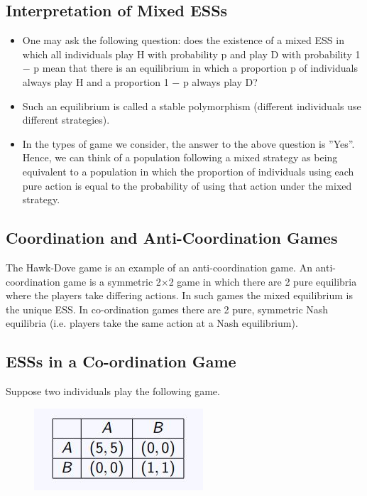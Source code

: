 \documentclass[]{report}
\begin{document}
	\subsection{Interpretation of Mixed ESSs}
\begin{itemize}
	\item One may ask the following question: does the existence of a mixed
	ESS in which all individuals play H with probability p and play D
	with probability 1 − p mean that there is an equilibrium in which a
	proportion p of individuals always play H and a proportion 1 − p
	always play D?
	\item 	Such an equilibrium is called a stable polymorphism (different
	individuals use different strategies).
	\item 	In the types of game we consider, the answer to the above
	question is ”Yes”. Hence, we can think of a population following a
	mixed strategy as being equivalent to a population in which the
	proportion of individuals using each pure action is equal to the
	probability of using that action under the mixed strategy.
\end{itemize}
	
	
	\subsection{Coordination and Anti-Coordination Games}
	The Hawk-Dove game is an example of an anti-coordination game.
	An anti-coordination game is a symmetric 2×2 game in which
	there are 2 pure equilibria where the players take differing actions.
	In such games the mixed equilibrium is the unique ESS.
	In co-ordination games there are 2 pure, symmetric Nash equilibria
	(i.e. players take the same action at a Nash equilibrium).
	
	\subsection{ESSs in a Co-ordination Game}
	Suppose two individuals play the following game.
\begin{figure}[h!]
\centering
\includegraphics[width=0.5\linewidth]{images/DR7-Slide17}
\caption{}
\label{fig:DR7-Slide17}
\end{figure}
\end{document}
